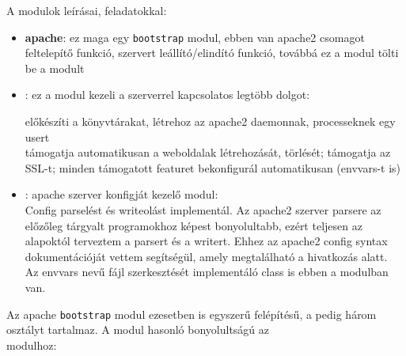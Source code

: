 A modulok leírásai, feladatokkal:
\begin{itemize}
	\item \textbf{apache}: ez maga egy \texttt{bootstrap} modul, ebben van apache2 csomagot feltelepítő funkció, szervert leállító/elindító funkció, továbbá ez a modul tölti be a \texttt{} modult
	\item \textbf{}: ez a modul kezeli a szerverrel kapcsolatos legtöbb dolgot:
	
	előkészíti a könyvtárakat, létrehoz az apache2 daemonnak, processeknek egy usert\\támogatja automatikusan a weboldalak létrehozását, törlését; támogatja az SSL-t; minden támogatott featuret bekonfigurál automatikusan (envvars-t is)

	\item \textbf{}: apache szerver konfigját kezelő modul:\\Config parselést és writeolást implementál. Az apache2 szerver parsere az előzőleg tárgyalt programokhoz képest bonyolultabb, ezért teljesen az alapoktól terveztem a parsert és a writert. Ehhez az apache2 config syntax dokumentációját vettem segítségül, amely megtalálható a \cite{apache_configuring} hivatkozás alatt.
	\\Az envvars nevű fájl szerkesztését implementáló class is ebben a modulban van.
\end{itemize}

\pagebreak

Az apache \texttt{bootstrap} modul ezesetben is egyszerű felépítésű, a \texttt{} pedig három osztályt tartalmaz. A \texttt{} modul hasonló bonyolultságú az \\\texttt{} modulhoz:
	
\hfill
	
